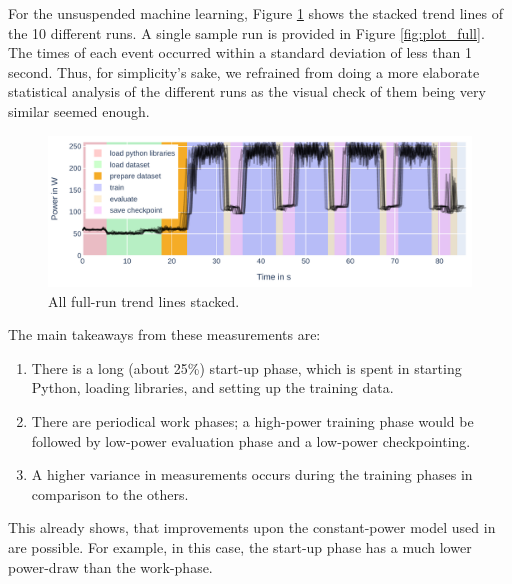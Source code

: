 For the unsuspended machine learning, Figure \ref{fig:plot_full_stacked} shows the stacked trend lines of the 10 different runs.
A single sample run is provided in Figure \ref{fig:plot_full}. 
The times of each event occurred within a standard deviation of less than 1 second.
Thus, for simplicity's sake, we refrained from doing a more elaborate statistical analysis of the different runs as the visual check of them being very similar seemed enough.

\begin{figure}[H]
    \includegraphics[width=\linewidth]{power-measurements/stacked_plots/roberta_full_0714.pdf}
    \caption{All full-run trend lines stacked. }
    \label{fig:plot_full_stacked}
\end{figure}

\newpage
The main takeaways from these measurements are:
\begin{enumerate}
    \item There is a long (about 25\%) start-up phase, which is spent in starting Python, loading libraries, and setting up the training data.
    \item There are periodical work phases; a high-power training phase would be followed by low-power evaluation phase and a low-power checkpointing.
    \item A higher variance in measurements occurs during the training phases in comparison to the others.
\end{enumerate}

This already shows, that improvements upon the constant-power model used in \cite{wiesner_lets_2021} are possible. 
For example, in this case, the start-up phase has a much lower power-draw than the work-phase.

